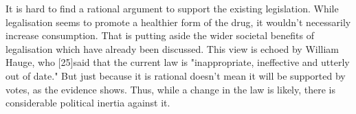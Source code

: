    It is hard to find a rational argument to support the existing
   legislation. While legalisation seems to promote a healthier form of
   the drug, it wouldn't necessarily increase consumption. That is putting
   aside the wider societal benefits of legalisation which have already
   been discussed. This view is echoed by William Hauge, who [25]said that
   the current law is "inappropriate, ineffective and utterly out of
   date." But just because it is rational doesn't mean it will be
   supported by votes, as the evidence shows. Thus, while a change in the
   law is likely, there is considerable political inertia against it.


